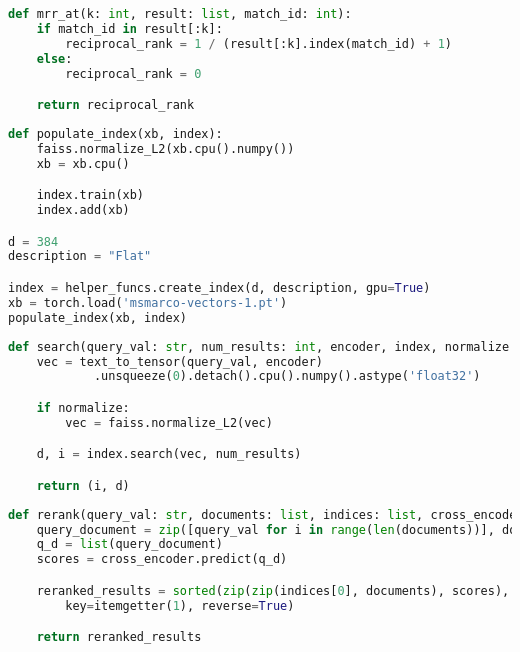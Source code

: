\begin{lstlisting}[language=Python, caption=Sposób obliczania MRR]
def mrr_at(k: int, result: list, match_id: int):
    if match_id in result[:k]:        
        reciprocal_rank = 1 / (result[:k].index(match_id) + 1)
    else:
        reciprocal_rank = 0

    return reciprocal_rank
\end{lstlisting}

\newpage

\begin{lstlisting}[language=Python, caption=Dodawanie rekordów do indeksu]
def populate_index(xb, index):
    faiss.normalize_L2(xb.cpu().numpy())
    xb = xb.cpu()

    index.train(xb)
    index.add(xb)

d = 384
description = "Flat"

index = helper_funcs.create_index(d, description, gpu=True)
xb = torch.load('msmarco-vectors-1.pt')
populate_index(xb, index)
\end{lstlisting}

\begin{lstlisting}[language=Python, caption=Wyszukiwanie zasobów]
def search(query_val: str, num_results: int, encoder, index, normalize:bool=True):
    vec = text_to_tensor(query_val, encoder)
            .unsqueeze(0).detach().cpu().numpy().astype('float32')

    if normalize:
        vec = faiss.normalize_L2(vec)

    d, i = index.search(vec, num_results)

    return (i, d)
\end{lstlisting}

\begin{lstlisting}[language=Python, caption=Reranking]
def rerank(query_val: str, documents: list, indices: list, cross_encoder):
    query_document = zip([query_val for i in range(len(documents))], documents)
    q_d = list(query_document)
    scores = cross_encoder.predict(q_d)

    reranked_results = sorted(zip(zip(indices[0], documents), scores), 
        key=itemgetter(1), reverse=True)

    return reranked_results
\end{lstlisting}
